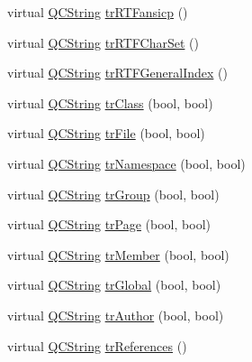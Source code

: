 \begin{DoxyCompactItemize}
virtual \mbox{\hyperlink{class_q_c_string}{Q\+C\+String}} \mbox{\hyperlink{class_translator_chinesetraditional_a823b4850251a1459b460f2a68f98f034}{tr\+R\+T\+Fansicp}} ()
\item 
virtual \mbox{\hyperlink{class_q_c_string}{Q\+C\+String}} \mbox{\hyperlink{class_translator_chinesetraditional_a003088d221f11675243a79a94b8ac6a4}{tr\+R\+T\+F\+Char\+Set}} ()
\item 
virtual \mbox{\hyperlink{class_q_c_string}{Q\+C\+String}} \mbox{\hyperlink{class_translator_chinesetraditional_ae7a8ad1b94cdbc2e09b3683197582917}{tr\+R\+T\+F\+General\+Index}} ()
\item 
virtual \mbox{\hyperlink{class_q_c_string}{Q\+C\+String}} \mbox{\hyperlink{class_translator_chinesetraditional_a667d8262125be0fcf73ca0d0343f84cf}{tr\+Class}} (bool, bool)
\item 
virtual \mbox{\hyperlink{class_q_c_string}{Q\+C\+String}} \mbox{\hyperlink{class_translator_chinesetraditional_abcdea164b370eb28a76e76393000ae7b}{tr\+File}} (bool, bool)
\item 
virtual \mbox{\hyperlink{class_q_c_string}{Q\+C\+String}} \mbox{\hyperlink{class_translator_chinesetraditional_a0bf83ac2c861396dfc2d3c274ad45fa4}{tr\+Namespace}} (bool, bool)
\item 
virtual \mbox{\hyperlink{class_q_c_string}{Q\+C\+String}} \mbox{\hyperlink{class_translator_chinesetraditional_a965461dc9248dfed432c3b5d04caf67d}{tr\+Group}} (bool, bool)
\item 
virtual \mbox{\hyperlink{class_q_c_string}{Q\+C\+String}} \mbox{\hyperlink{class_translator_chinesetraditional_af2b72609a18bb94d243282d75a4afd3e}{tr\+Page}} (bool, bool)
\item 
virtual \mbox{\hyperlink{class_q_c_string}{Q\+C\+String}} \mbox{\hyperlink{class_translator_chinesetraditional_ac5f6cc87f332594ddd9a1b3a9566e695}{tr\+Member}} (bool, bool)
\item 
virtual \mbox{\hyperlink{class_q_c_string}{Q\+C\+String}} \mbox{\hyperlink{class_translator_chinesetraditional_ac86e1154739fb45ae06fc17522c0d898}{tr\+Global}} (bool, bool)
\item 
virtual \mbox{\hyperlink{class_q_c_string}{Q\+C\+String}} \mbox{\hyperlink{class_translator_chinesetraditional_ab96d9f905b0b31764eb86c3085a14520}{tr\+Author}} (bool, bool)
\item 
virtual \mbox{\hyperlink{class_q_c_string}{Q\+C\+String}} \mbox{\hyperlink{class_translator_chinesetraditional_a52e273de98bc9cb2b95f4c2316848a26}{tr\+References}} ()
\item 

\end{DoxyCompactItemize}
